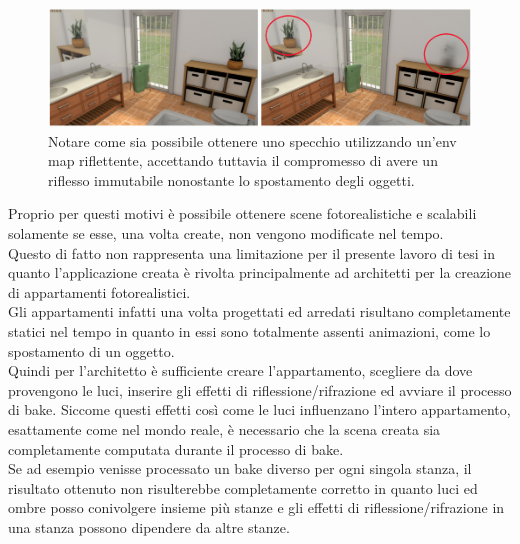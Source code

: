 \\
\begin{figure}[htb]
 \centering
 \includegraphics[width=1\linewidth]{images/chapter_lrl/lrl_appl2.png}\hfill
 \caption[Applicabilità, riflesso con env map]{Notare come sia possibile ottenere uno specchio utilizzando un'env map riflettente, accettando tuttavia il compromesso di avere un riflesso immutabile nonostante lo spostamento degli oggetti.}
 \label{fig:lrl_appl2}
\end{figure}
Proprio per questi motivi è possibile ottenere scene fotorealistiche e scalabili solamente se esse, una volta create, non vengono modificate nel tempo.
\\
Questo di fatto non rappresenta una limitazione per il presente lavoro di tesi in quanto l’applicazione creata è rivolta principalmente ad architetti per la creazione di appartamenti fotorealistici.
\\
Gli appartamenti infatti una volta progettati ed arredati risultano completamente statici nel tempo in quanto in essi sono totalmente assenti animazioni, come lo spostamento di un oggetto.
\\
Quindi per l’architetto è sufficiente creare l’appartamento, scegliere da dove provengono le luci, inserire gli effetti di riflessione/rifrazione ed avviare il processo di bake.
Siccome questi effetti così come le luci influenzano l’intero appartamento, esattamente come nel mondo reale, è necessario che la scena creata sia completamente computata durante il processo di bake. 
\\
Se ad esempio venisse processato un bake diverso per ogni singola stanza, il risultato ottenuto non risulterebbe completamente corretto in quanto luci ed ombre posso conivolgere insieme più stanze e gli effetti di riflessione/rifrazione in una stanza possono dipendere da altre stanze.
\\
